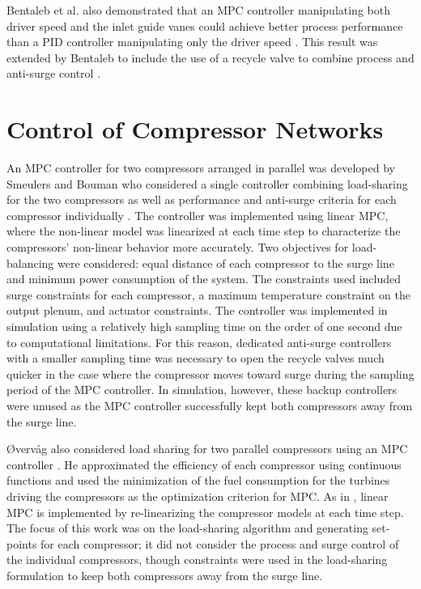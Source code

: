 Bentaleb et al. also demonstrated that an MPC controller manipulating both driver speed and the inlet guide vanes could achieve better process performance than a PID controller manipulating only the driver speed \cite{Bentaleb2014}.
This result was extended by Bentaleb to include the use of a recycle valve to combine process and anti-surge control \cite{Bentaleb2015}.


\section{Control of Compressor Networks}

An MPC controller for two compressors arranged in parallel was developed by Smeulers and Bouman who considered a single controller combining load-sharing for the two compressors as well as performance and anti-surge criteria for each compressor individually \cite{Smeulers1999}. 
The controller was implemented using linear MPC, where the non-linear model was linearized at each time step to characterize the compressors' non-linear behavior more accurately.
Two objectives for load-balancing were considered: equal distance of each compressor to the surge line and minimum power consumption of the system. 
The constraints used included surge constraints for each compressor, a maximum temperature constraint on the output plenum, and actuator constraints.
The controller was implemented in simulation using a relatively high sampling time on the order of one second due to computational limitations. 
For this reason, dedicated anti-surge controllers with a smaller sampling time was necessary to open the recycle valves much quicker in the case where the compressor moves toward surge during the sampling period of the MPC controller. 
In simulation, however, these backup controllers were unused as the MPC controller successfully kept both compressors away from the surge line.

Øvervåg also considered load sharing for two parallel compressors using an MPC controller \cite{Oevervaag2013}. 
He approximated the efficiency of each compressor using continuous functions and used the minimization of the fuel consumption for the turbines driving the compressors as the optimization criterion for MPC. 
As in \cite{Smeulers1999}, linear MPC is implemented by re-linearizing the compressor models at each time step.
The focus of this work was on the load-sharing algorithm and generating set-points for each compressor; it did not consider the process and surge control of the individual compressors, though constraints were used in the load-sharing formulation to keep both compressors away from the surge line.

